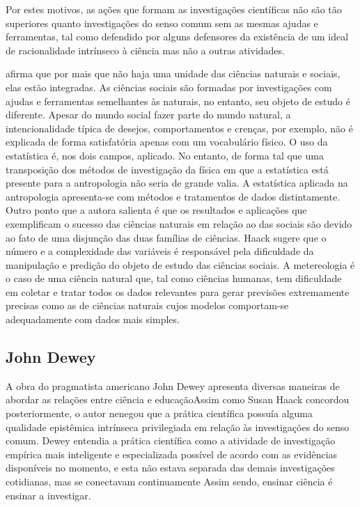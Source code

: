 \documentclass[12pt]{report}
\begin{document}
		Por estes motivos, as ações que formam as investigações científicas não são tão superiores quanto investigações do senso comum sem as mesmas ajudas e ferramentas, tal como defendido por alguns defensores da existência de um ideal de racionalidade intrínseco à ciência mas não a outras atividades.

		\textcite{haack-defending-science} afirma que por mais que não haja uma unidade das ciências naturais e sociais, elas estão integradas.
		As ciências sociais são formadas por investigações com ajudas e ferramentas semelhantes às naturais, no entanto, seu objeto de estudo é diferente.
		Apesar do mundo social fazer parte do mundo natural, a intencionalidade típica de desejos, comportamentos e crenças, por exemplo, não é explicada de forma satisfatória apenas com um vocabulário físico.
		O uso da estatística é, nos dois campos, aplicado.
		No entanto, de forma tal que uma transposição dos métodos de investigação da física em que a estatística está presente para a antropologia não seria de grande valia.
		A estatística aplicada na antropologia apresenta-se com métodos e tratamentos de dados distintamente.
		Outro ponto que a autora salienta é que os resultados e aplicações que exemplificam o sucesso das ciências naturais em relação ao das sociais são devido ao fato de uma disjunção das duas famílias de ciências.
		Haack sugere que o número e a complexidade das variáveis é responsável pela dificuldade da manipulação e predição do objeto de estudo das ciências sociais.
		A metereologia é o caso de uma ciência natural que, tal como ciências humanas, tem dificuldade em coletar e tratar todos os dados relevantes para gerar previsões extremamente precisas como as de ciências naturais cujos modelos comportam-se adequadamente com dados mais simples.
	
	\subsection{John Dewey}
	
		A obra do pragmatista americano John Dewey apresenta diversas maneiras de abordar as relações entre ciência e educaçãoAssim como Susan Haack concordou posteriormente, o autor nenegou que a prática científica possuía alguma qualidade epistêmica intrínseca privilegiada em relação às investigações do senso comum.
		Dewey entendia a prática científica como a atividade de investigação empírica mais inteligente e especializada possível de acordo com as evidências disponíveis no momento, e esta não estava separada das demais investigações cotidianas, mas se conectavam continuamente
		Assim sendo, ensinar ciência é ensinar a investigar.
		
\end{document}
